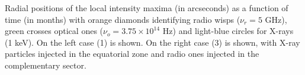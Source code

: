 Radial positions of the local intensity maxima (in arcseconds) as a function of time (in months) with orange diamonds identifying radio wisps ($\nu_r=5$ GHz), green crosses optical ones ($\nu_o=3.75 \times 10^{14}$ Hz) and light-blue circles for X-rays (1 keV). 
On the left case (1) is shown. On the right case (3) is shown, with X-ray particles injected in the equatorial zone and radio ones injected in the complementary sector. 
\label{fig:wisp1}
